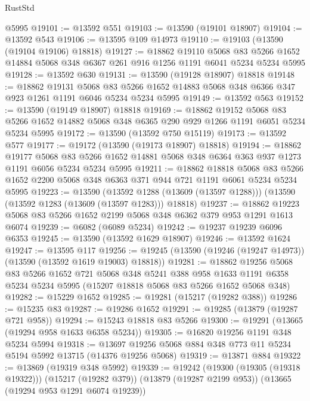 \begin{lexlean}{RustStd}
\begin{coremodule}
    @5995
@19101 := @13592 @551
@19103 := @13590 (@19101 @18907)
@19104 := @13592 @543
@19106 := @13595 @109 @14973
@19110 := @19103 (@13590 (@19104 @19106) @18818)
@19127 := @18862
    @19110
    @5068
    @83
    @5266
    @1652
    @14884
    @5068
    @348
    @6367
    @261
    @916
    @1256
    @1191
    @6041
    @5234
    @5234
    @5995
@19128 := @13592 @630
@19131 := @13590 (@19128 @18907) @18818
@19148 := @18862
    @19131
    @5068
    @83
    @5266
    @1652
    @14883
    @5068
    @348
    @6366
    @347
    @923
    @1261
    @1191
    @6046
    @5234
    @5234
    @5995
@19149 := @13592 @563
@19152 := @13590 (@19149 @18907) @18818
@19169 := @18862
    @19152
    @5068
    @83
    @5266
    @1652
    @14882
    @5068
    @348
    @6365
    @290
    @929
    @1266
    @1191
    @6051
    @5234
    @5234
    @5995
@19172 := @13590 (@13592 @750 @15119)
@19173 := @13592 @577
@19177 := @19172 (@13590 (@19173 @18907) @18818)
@19194 := @18862
    @19177
    @5068
    @83
    @5266
    @1652
    @14881
    @5068
    @348
    @6364
    @363
    @937
    @1273
    @1191
    @6056
    @5234
    @5234
    @5995
@19211 := @18862
    @18818
    @5068
    @83
    @5266
    @1652
    @2200
    @5068
    @348
    @6363
    @371
    @944
    @721
    @1191
    @6061
    @5234
    @5234
    @5995
@19223 := @13590
    (@13592 @1288 (@13609 (@13597 @1288)))
    (@13590 (@13592 @1283 (@13609 (@13597 @1283))) @18818)
@19237 := @18862 @19223 @5068 @83 @5266 @1652 @2199 @5068 @348 @6362 @379 @953 @1291 @1613 @6074
@19239 := @6082 (@6089 @5234)
@19242 := @19237 @19239 @6096 @6353
@19245 := @13590 (@13592 @1629 @18907)
@19246 := @13592 @1624
@19247 := @13595 @117
@19256 := @19245 (@13590 (@19246 (@19247 @14973)) (@13590 (@13592 @1619 @19003) @18818))
@19281 := @18862
    @19256
    @5068
    @83
    @5266
    @1652
    @721
    @5068
    @348
    @5241
    @388
    @958
    @1633
    @1191
    @6358
    @5234
    @5234
    @5995
    (@15207 @18818 @5068 @83 @5266 @1652 @5068 @348)
@19282 := @15229 @1652
@19285 := @19281 (@15217 (@19282 @388))
@19286 := @15235 @83
@19287 := @19286 @1652
@19291 := @19285 (@13879 (@19287 @721 @958))
@19294 := @15243 @18818 @83 @5266
@19300 := @19291 (@13665 (@19294 @958 @1633 @6358 @5234))
@19305 := @16820 @19256 @1191 @348 @5234 @5994
@19318 := @13697 @19256 @5068 @884 @348 @773 @11 @5234 @5194 @5992 @13715 (@14376 @19256 @5068)
@19319 := @13871 @884
@19322 := @13869 (@19319 @348 @5992)
@19339 := @19242
    (@19300 (@19305 (@19318 @19322)))
    (@15217 (@19282 @379))
    (@13879 (@19287 @2199 @953))
    (@13665 (@19294 @953 @1291 @6074 @19239))

\end{coremodule}
\end{lexlean}
